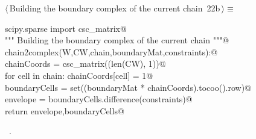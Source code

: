 \documentclass[11pt,oneside]{article}	%
\begin{document}
\begin{flushleft} \small \label{scrap26}
\protect{}$\langle\,$Building the boundary complex of the current chain\nobreak\ {\footnotesize 22b}$\,\rangle\equiv$
\vspace{-1ex}
\begin{list}{}{} \item
\mbox{}\verb@from scipy.sparse import csc_matrix@\\
\mbox{}\verb@""" Building the boundary complex of the current chain """@\\
\mbox{}\verb@def chain2complex(W,CW,chain,boundaryMat,constraints):@\\
\mbox{}\verb@   chainCoords = csc_matrix((len(CW), 1))@\\
\mbox{}\verb@   for cell in chain: chainCoords[cell] = 1@\\
\mbox{}\verb@   boundaryCells = set((boundaryMat * chainCoords).tocoo().row)@\\
\mbox{}\verb@   envelope = boundaryCells.difference(constraints)@\\
\mbox{}\verb@   return envelope,boundaryCells@\\
\mbox{}\verb@@{\NWsep}
\end{list}
\vspace{-1ex}
\footnotesize\addtolength{\baselineskip}{-1ex}
\begin{list}{}{\setlength{\itemsep}{-\parsep}\setlength{\itemindent}{-\leftmargin}}
\item \NWtxtMacroRefIn\ .
\end{list}
\end{flushleft}
\end{document}
